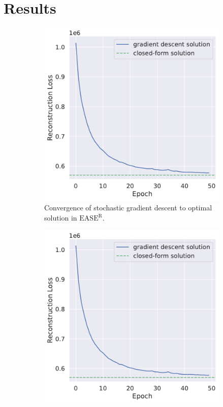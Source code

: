 \documentclass{article}
\newcommand{\easer}{$\text{EASE}^\text{R}$}
\begin{document}
\section{Results}

\begin{figure}[h]
	\centering
	\begin{subfigure}[b]{0.4\textwidth}
		\centering
		\includegraphics[width=\textwidth]{figures/recon-loss.pdf}
		\caption{Convergence of stochastic gradient descent to optimal
			solution in \easer.}
		\label{fig:convergence}
	\end{subfigure}
	\begin{subfigure}[b]{0.4\textwidth}
		\centering
		\includegraphics[width=\textwidth]{figures/recon-loss.pdf}

\end{subfigure}
\end{figure}
\end{document}
